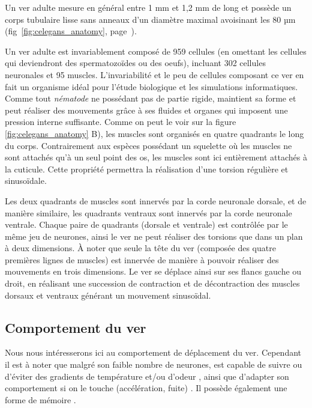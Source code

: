 Un ver \celeg{} adulte mesure en général entre 1 mm et 1,2 mm de long et
possède un corps tubulaire lisse sans anneaux d'un diamètre maximal
avoisinant les 80 µm (fig~\ref{fig:celegans_anatomy},
page~\pageref{fig:celegans_anatomy}).

Un ver adulte est invariablement composé de 959 cellules (en omettant les
cellules qui deviendront des spermatozoïdes ou des oeufs), incluant 302
cellules neuronales et 95 muscles.  \cite{Boyle2009} L'invariabilité et le peu de
cellules composant ce ver en fait un organisme idéal pour l'étude
biologique et les simulations informatiques.\\


Comme tout \textit{nématode} ne possédant pas de partie rigide, \celeg{}
maintient sa forme et peut réaliser des mouvements grâce à ses fluides et
organes qui imposent une pression interne suffisante. Comme on peut le voir sur
la figure \ref{fig:celegans_anatomy} B), les muscles sont organisés en quatre
quadrants le long du corps. Contrairement aux espèces possédant un squelette où
les muscles ne sont attachés qu'à un seul point des os, les muscles sont ici
entièrement attachés à la cuticule. Cette propriété permettra la réalisation
d'une torsion régulière et sinusoïdale.

Les deux quadrants de muscles sont innervés par la corde neuronale dorsale, et
de manière similaire, les quadrants ventraux sont innervés par la corde
neuronale ventrale. Chaque paire de quadrants (dorsale et ventrale) est
contrôlée par le même jeu de neurones, ainsi le ver ne peut réaliser des
torsions que dans un plan à deux dimensions. À noter que seule la tête du ver
(composée des quatre premières lignes de muscles) est innervée de manière à
pouvoir réaliser des mouvements en trois dimensions. Le ver se déplace ainsi
sur ses flancs gauche ou droit, en réalisant une succession de contraction et
de décontraction des muscles dorsaux et ventraux générant un mouvement
sinusoïdal.


\subsection{Comportement du ver} %
\label{sub:Comportement du ver}

Nous nous intéresserons ici au comportement de déplacement du ver. Cependant il est
à noter que malgré son faible nombre de neurones, \celeg{} est capable de
suivre ou d'éviter des gradients de température et/ou d'odeur
\cite{Ferree1999,Gray2005}, ainsi que d'adapter son comportement si on le touche
(accélération, fuite) \cite{Chalfie1985}. Il possède également une forme de
mémoire \cite{Rankin2005a}.\\

